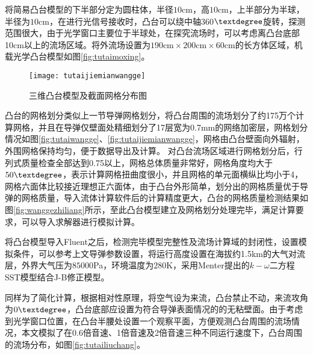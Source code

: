 将简易凸台模型的下半部分定为圆柱体，半径$10$cm，高$10$cm，上半部分为半球，半径为$10$cm，在进行光信号接收时，凸台可以绕中轴360$\textdegree$旋转，探测范围很大，由于光学窗口主要位于半球处，在探究流场时，可以考虑离凸台底部10cm以上的流场区域。将外流场设置为$190\text{cm}\times200\text{cm}\times60\text{cm}$的长方体区域，机载光学凸台模型如图\ref{fig:tutaimoxing}。
\begin{figure}[bhpt]
\centering
{}
{\texttt{[image: tutaijiemianwangge]}}
\caption{三维凸台模型及截面网格分布图}
\label{fig:tutai}
\end{figure}

凸台的网格划分类似上一节导弹网格划分，将凸台周围的流场划分了约175万个计算网格，并且在导弹仅壁面处精细划分了17层宽为0.7mm的网络加密层，网格划分情况如图\ref{fig:tutaiwangge}、\ref{fig:tutaijiemianwangge}，网格由凸台壁面向外辐射，外围网格保持均匀，便于数据导出及计算。
对凸台流场区域进行网格划分后，行列式质量检查全部达到0.75以上，网格总体质量非常好，网格角度均大于$50\textdegree$，表示计算网格扭曲度很小，并且网格的单元面横纵比均小于4，网格六面体比较接近理想正六面体，由于凸台外形简单，划分出的网格质量优于导弹的网格质量，导入流体计算软件后的计算精度更大，凸台的网格质量检测结果如图\ref{fig:wanggezhiliang}所示，至此凸台模型建立及网格划分处理完毕，满足计算要求，可以导入求解器进行模拟计算。

将凸台模型导入Fluent之后，检测完毕模型完整性及流场计算域的封闭性，设置模拟条件，可以参考上文导弹参数设置，将运行高度设置在海拔约1.5km的大气对流层，外界大气压为$85000$Pa，环境温度为$280$K，采用Menter提出的$k-\omega$二方程SST模型结合J-B修正模型。

同样为了简化计算，根据相对性原理，将空气设为来流，凸台禁止不动，来流攻角为$0\textdegree$，凸台底部应设置为符合导弹表面情况的的无粘壁面。由于考虑到光学窗口位置，在凸台半腰处设置一个观察平面，方便观测凸台周围的流场情况，本文模拟了在0.6倍音速、1倍音速及2倍音速三种不同运行速度下，凸台周围的流场分布，如图\ref{fig:tutailiuchang}。

